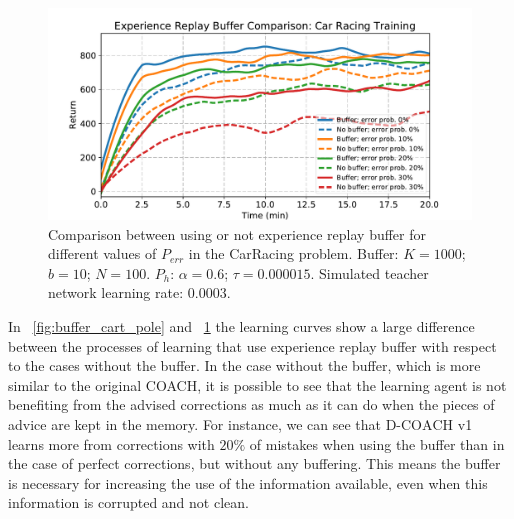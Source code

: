 \begin{figure}[t]
    \centering
    \vspace{-0.2cm}
    \includegraphics[width=0.9\linewidth]{imagenes/cap3/bufferCarRacing.pdf}
    \vspace{-0.2cm}
    \caption{Comparison between using or not experience replay buffer for different values of $P_\mathit{err}$ in the CarRacing problem. Buffer: $K = 1000$; $b = 10$; $N = 100$. $P_{h}$: $\alpha = 0.6$; $\tau = 0.000015$. Simulated teacher network learning rate: $0.0003$.}
    \label{fig:buffer_car_racing}
\end{figure}

In \figurename~{\ref{fig:buffer_cart_pole}} and \figurename~{\ref{fig:buffer_car_racing}} the learning curves show a large difference between the processes of learning that use experience replay buffer with respect to the cases without the buffer. In the case without the buffer, which is more similar to the original COACH, it is possible to see that the learning agent is not benefiting from the advised corrections as much as it can do when the pieces of advice are kept in the memory. For instance, we can see that $\text{D-COACH}$ v1 learns more from corrections with $20 \%$ of mistakes when using the buffer than in the case of perfect corrections, but without any buffering. This means the buffer is necessary for increasing the use of the information available, even when this information is corrupted and not clean.


